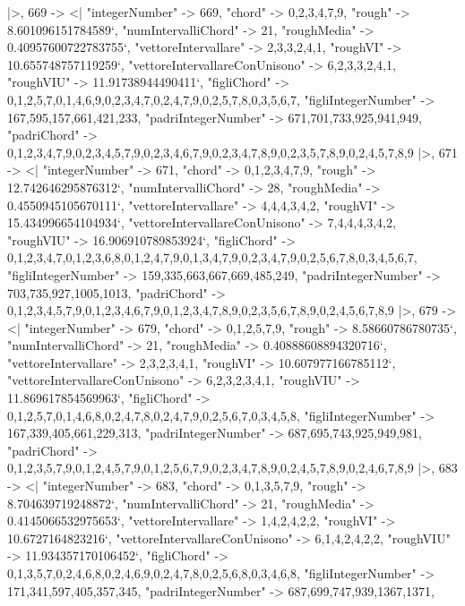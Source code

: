 \documentclass[
]{article}
\begin{document}
\begin{DatasetVerbatim}
  |>,
  669 -> <|
    "integerNumber" -> 669,
    "chord" -> {0,2,3,4,7,9},
    "rough" -> 8.601096151784589`,
    "numIntervalliChord" -> 21,
    "roughMedia" -> 0.40957600722783755`,
    "vettoreIntervallare" -> {2,3,3,2,4,1},
    "roughVI" -> 10.655748757119259`,
    "vettoreIntervallareConUnisono" -> {6,2,3,3,2,4,1},
    "roughVIU" -> 11.91738944490411`,
    "figliChord" -> {{0,1,2,5,7},{0,1,4,6,9},{0,2,3,4,7},{0,2,4,7,9},{0,2,5,7,8},{0,3,5,6,7}},
    "figliIntegerNumber" -> {167,595,157,661,421,233},
    "padriIntegerNumber" -> {671,701,733,925,941,949},
    "padriChord" -> {{0,1,2,3,4,7,9},{0,2,3,4,5,7,9},{0,2,3,4,6,7,9},{0,2,3,4,7,8,9},{0,2,3,5,7,8,9},{0,2,4,5,7,8,9}}
  |>,
  671 -> <|
    "integerNumber" -> 671,
    "chord" -> {0,1,2,3,4,7,9},
    "rough" -> 12.742646295876312`,
    "numIntervalliChord" -> 28,
    "roughMedia" -> 0.4550945105670111`,
    "vettoreIntervallare" -> {4,4,4,3,4,2},
    "roughVI" -> 15.434996654104934`,
    "vettoreIntervallareConUnisono" -> {7,4,4,4,3,4,2},
    "roughVIU" -> 16.906910789853924`,
    "figliChord" -> {{0,1,2,3,4,7},{0,1,2,3,6,8},{0,1,2,4,7,9},{0,1,3,4,7,9},{0,2,3,4,7,9},{0,2,5,6,7,8},{0,3,4,5,6,7}},
    "figliIntegerNumber" -> {159,335,663,667,669,485,249},
    "padriIntegerNumber" -> {703,735,927,1005,1013},
    "padriChord" -> {{0,1,2,3,4,5,7,9},{0,1,2,3,4,6,7,9},{0,1,2,3,4,7,8,9},{0,2,3,5,6,7,8,9},{0,2,4,5,6,7,8,9}}
  |>,
  679 -> <|
    "integerNumber" -> 679,
    "chord" -> {0,1,2,5,7,9},
    "rough" -> 8.58660786780735`,
    "numIntervalliChord" -> 21,
    "roughMedia" -> 0.40888608894320716`,
    "vettoreIntervallare" -> {2,3,2,3,4,1},
    "roughVI" -> 10.607977166785112`,
    "vettoreIntervallareConUnisono" -> {6,2,3,2,3,4,1},
    "roughVIU" -> 11.869617854569963`,
    "figliChord" -> {{0,1,2,5,7},{0,1,4,6,8},{0,2,4,7,8},{0,2,4,7,9},{0,2,5,6,7},{0,3,4,5,8}},
    "figliIntegerNumber" -> {167,339,405,661,229,313},
    "padriIntegerNumber" -> {687,695,743,925,949,981},
    "padriChord" -> {{0,1,2,3,5,7,9},{0,1,2,4,5,7,9},{0,1,2,5,6,7,9},{0,2,3,4,7,8,9},{0,2,4,5,7,8,9},{0,2,4,6,7,8,9}}
  |>,
  683 -> <|
    "integerNumber" -> 683,
    "chord" -> {0,1,3,5,7,9},
    "rough" -> 8.704639719248872`,
    "numIntervalliChord" -> 21,
    "roughMedia" -> 0.4145066532975653`,
    "vettoreIntervallare" -> {1,4,2,4,2,2},
    "roughVI" -> 10.6727164823216`,
    "vettoreIntervallareConUnisono" -> {6,1,4,2,4,2,2},
    "roughVIU" -> 11.934357170106452`,
    "figliChord" -> {{0,1,3,5,7},{0,2,4,6,8},{0,2,4,6,9},{0,2,4,7,8},{0,2,5,6,8},{0,3,4,6,8}},
    "figliIntegerNumber" -> {171,341,597,405,357,345},
    "padriIntegerNumber" -> {687,699,747,939,1367,1371},

\end{DatasetVerbatim}
\end{document}
